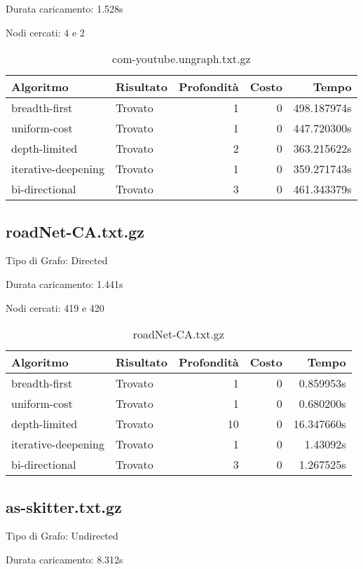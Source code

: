 Durata caricamento: 1.528s

Nodi cercati: 4 e 2

\begin{table}[h]
\centering
\begin{tabular}{|l|l|r|r|r|}
\hline
\textbf{Algoritmo} & \textbf{Risultato} & \textbf{Profondità} & \textbf{Costo} & \textbf{Tempo} \\
 \hline
breadth-first & Trovato & 1 & 0 & 498.187974s \\
uniform-cost & Trovato & 1 & 0 & 447.720300s \\
depth-limited & Trovato & 2 & 0 & 363.215622s \\
iterative-deepening & Trovato & 1 & 0 & 359.271743s \\
bi-directional & Trovato & 3 & 0 & 461.343379s \\
\hline
\end{tabular}
\caption{com-youtube.ungraph.txt.gz}
\end{table}
\newpage
\subsection{roadNet-CA.txt.gz}
Tipo di Grafo: Directed

Durata caricamento: 1.441s

Nodi cercati: 419 e 420

\begin{table}[h]
\centering
\begin{tabular}{|l|l|r|r|r|}
\hline
\textbf{Algoritmo} & \textbf{Risultato} & \textbf{Profondità} & \textbf{Costo} & \textbf{Tempo} \\
 \hline
breadth-first & Trovato & 1 & 0 & 0.859953s \\
uniform-cost & Trovato & 1 & 0 & 0.680200s \\
depth-limited & Trovato & 10 & 0 & 16.347660s \\
iterative-deepening & Trovato & 1 & 0 & 1.43092s \\
bi-directional & Trovato & 3 & 0 & 1.267525s \\
\hline
\end{tabular}
\caption{roadNet-CA.txt.gz}
\end{table}
\subsection{as-skitter.txt.gz}
Tipo di Grafo: Undirected

Durata caricamento: 8.312s

